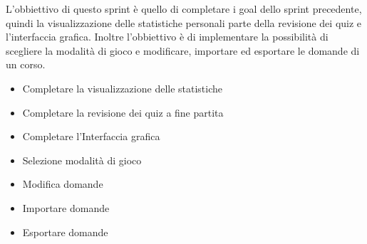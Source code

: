L'obbiettivo di questo sprint è quello di completare i goal dello sprint precedente, quindi la visualizzazione delle statistiche personali parte della revisione dei quiz e l'interfaccia grafica. Inoltre l'obbiettivo è di implementare la possibilità di scegliere la modalità di gioco e modificare, importare ed esportare le domande di un corso.
\begin{itemize}
    \item Completare la visualizzazione delle statistiche
    \item Completare la revisione dei quiz a fine partita
    \item Completare l'Interfaccia grafica
    \item Selezione modalità di gioco
    \item Modifica domande
    \item Importare domande
    \item Esportare domande
\end{itemize} 
